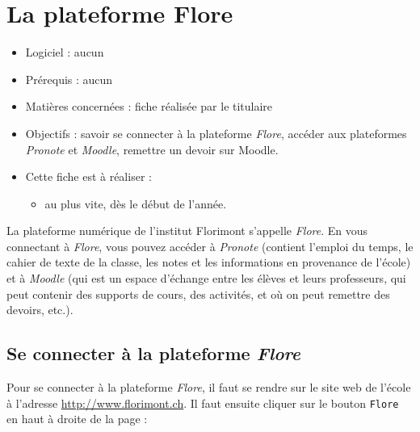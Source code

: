 \chapter{La plateforme Flore}\label{plateformeFlore}  

\begin{itemize}
\item Logiciel : aucun
\item Prérequis : aucun
\item Matières concernées : fiche réalisée par le titulaire
\item Objectifs : savoir se connecter à la plateforme \emph{Flore}, accéder aux plateformes \emph{Pronote} et \emph{Moodle}, remettre un devoir sur Moodle.
\item Cette fiche est à réaliser :
        \begin{itemize}
        \item au plus vite, dès le début de l'année. 
        \end{itemize}
\end{itemize}

\vspace{12pt}

La plateforme numérique de l'institut Florimont s'appelle \emph{Flore}. En vous connectant à \emph{Flore}, vous pouvez accéder à \emph{Pronote} (contient l'emploi du temps, le cahier de texte de la classe, les notes et les informations en provenance de l'école) et à \emph{Moodle} (qui est un espace d'échange entre les élèves et leurs professeurs, qui peut contenir des supports de cours, des activités, et où on peut remettre des devoirs, etc.).

\section{Se connecter à la plateforme \emph{Flore}}\label{FloreConnexion}

Pour se connecter à la plateforme \emph{Flore}, il faut se rendre sur le site web de l'école à l'adresse \url{http://www.florimont.ch}. Il faut ensuite cliquer sur le bouton \texttt{Flore} en haut à droite de la page :


